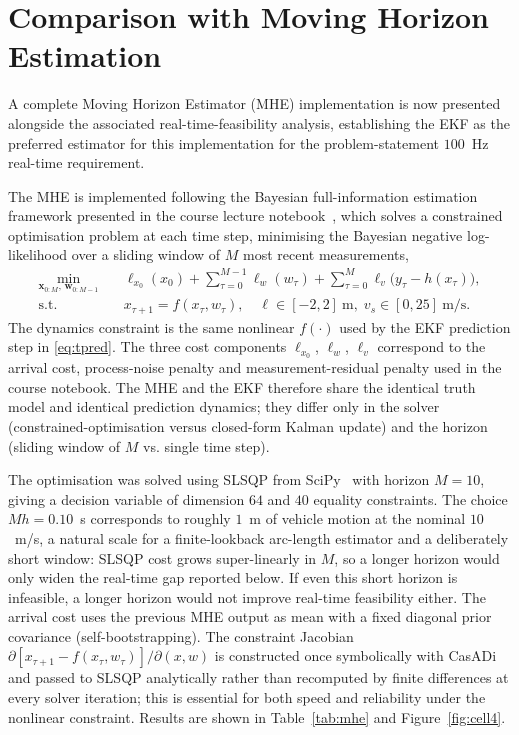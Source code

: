\documentclass[11pt,a4paper]{article}
\begin{document}
\FloatBarrier
\section{Comparison with Moving Horizon Estimation}
\label{sec:mhe}

A complete Moving Horizon Estimator (MHE) implementation is now
presented alongside the associated real-time-feasibility analysis,
establishing the EKF as the preferred estimator for this implementation for the
problem-statement $100$~Hz real-time requirement.

The MHE is implemented following the Bayesian full-information
estimation framework presented in the course lecture
notebook~\cite{Sopasakis_2_bayesian_fie}, which solves a constrained
optimisation problem at each time step, minimising the Bayesian
negative log-likelihood over a sliding window of $M$ most recent
measurements,
\begin{equation}
\begin{aligned}
\min_{\bm{x}_{0:M},\,\bm{w}_{0:M-1}}\quad
&\ell_{x_0}(x_0)
 +\sum_{\tau=0}^{M-1}\ell_w(w_\tau)
 +\sum_{\tau=0}^{M}\ell_v\!\bigl(y_\tau-h(x_\tau)\bigr),\\[2pt]
\text{s.t.}\quad
&x_{\tau+1}=f(x_\tau,w_\tau),\quad
 \ell\in[-2,2]~\text{m},\;v_s\in[0,25]~\text{m/s}.
\end{aligned}
\label{eq:mhe}
\end{equation}
The dynamics constraint is the same nonlinear $f(\cdot)$ used by
the EKF prediction step in \eqref{eq:tpred}. The three cost components $\ell_{x_0}$, $\ell_w$,
$\ell_v$ correspond to the arrival cost, process-noise penalty and
measurement-residual penalty used in the course notebook. The MHE and
the EKF therefore share the identical truth model and identical
prediction dynamics; they differ only in the solver
(constrained-optimisation versus closed-form Kalman update) and the
horizon (sliding window of $M$ vs. single time step).

The optimisation was solved using SLSQP from
SciPy~\cite{Virtanen2020} with horizon $M=10$, giving a decision
variable of dimension $64$ and $40$ equality constraints. The choice
$Mh=0.10$~s corresponds to roughly $1$~m of vehicle motion at the
nominal $10$~m/s, a natural scale for a finite-lookback arc-length
estimator and a deliberately short window: SLSQP cost grows
super-linearly in $M$, so a longer horizon would only widen the
real-time gap reported below. If even this short horizon is
infeasible, a longer horizon would not improve real-time
feasibility either. The arrival cost uses the previous MHE
output as mean with a fixed diagonal prior covariance
(self-bootstrapping). The constraint Jacobian
$\partial[x_{\tau+1}-f(x_\tau,w_\tau)]/\partial(x,w)$ is constructed
once symbolically with CasADi and passed to SLSQP analytically rather
than recomputed by finite differences at every solver iteration; this
is essential for both speed and reliability under the nonlinear
constraint. Results are shown in Table~\ref{tab:mhe} and
Figure~\ref{fig:cell4}.
\end{document}
